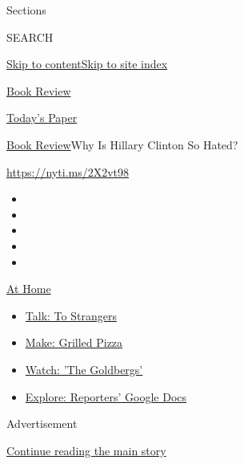 Sections

SEARCH

\protect\hyperlink{site-content}{Skip to
content}\protect\hyperlink{site-index}{Skip to site index}

\href{https://www.nytimes.com/section/books/review}{Book Review}

\href{https://myaccount.nytimes.com/auth/login?response_type=cookie\&client_id=vi}{}

\href{https://www.nytimes.com/section/todayspaper}{Today's Paper}

\href{/section/books/review}{Book Review}\textbar{}Why Is Hillary
Clinton So Hated?

\url{https://nyti.ms/2X2vt98}

\begin{itemize}
\item
\item
\item
\item
\item
\end{itemize}

\href{https://www.nytimes.com/spotlight/at-home?action=click\&pgtype=Article\&state=default\&region=TOP_BANNER\&context=at_home_menu}{At
Home}

\begin{itemize}
\tightlist
\item
  \href{https://www.nytimes.com/2020/08/03/well/family/the-benefits-of-talking-to-strangers.html?action=click\&pgtype=Article\&state=default\&region=TOP_BANNER\&context=at_home_menu}{Talk:
  To Strangers}
\item
  \href{https://www.nytimes.com/2020/08/01/at-home/coronavirus-make-pizza-on-a-grill.html?action=click\&pgtype=Article\&state=default\&region=TOP_BANNER\&context=at_home_menu}{Make:
  Grilled Pizza}
\item
  \href{https://www.nytimes.com/2020/07/31/arts/television/goldbergs-abc-stream.html?action=click\&pgtype=Article\&state=default\&region=TOP_BANNER\&context=at_home_menu}{Watch:
  'The Goldbergs'}
\item
  \href{https://www.nytimes.com/interactive/2020/at-home/even-more-reporters-editors-diaries-lists-recommendations.html?action=click\&pgtype=Article\&state=default\&region=TOP_BANNER\&context=at_home_menu}{Explore:
  Reporters' Google Docs}
\end{itemize}

Advertisement

\protect\hyperlink{after-top}{Continue reading the main story}

